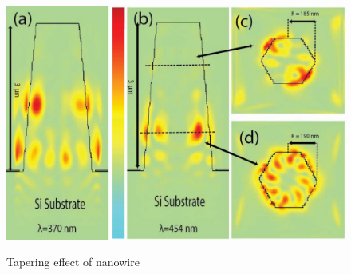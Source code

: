 \begin{figure}
  \caption{Tapering effect of nanowire}
  \centering
  \includegraphics[width=\textwidth]{pictures/LM/Tapering}
  \label{Tapering}
\end{figure}




